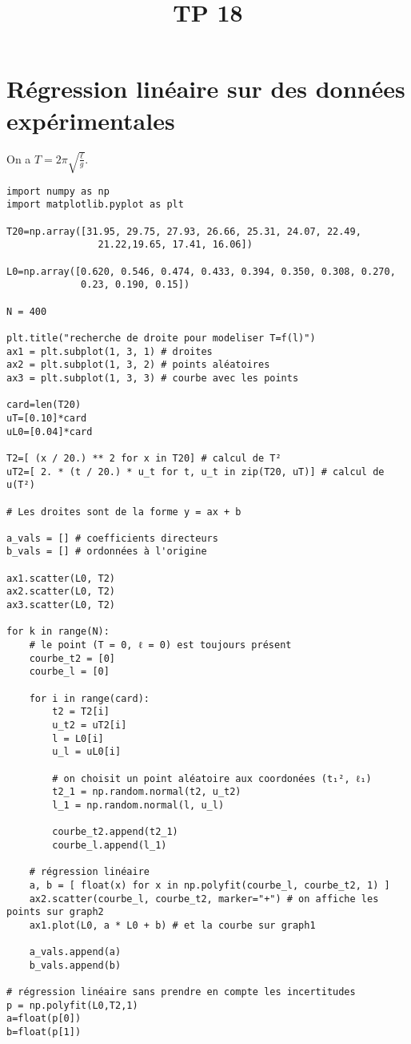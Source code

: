\documentclass[a4paper]{report}
\title{TP 18}{Programmation en Python}{Hugo {\sc Salou}}
\begin{document}
	\section{Régression linéaire sur des données expérimentales}

	On a $T = 2\pi\sqrt{\frac{\ell}{g}}$.

	\begin{verbatim}
import numpy as np
import matplotlib.pyplot as plt

T20=np.array([31.95, 29.75, 27.93, 26.66, 25.31, 24.07, 22.49,
				21.22,19.65, 17.41, 16.06])

L0=np.array([0.620, 0.546, 0.474, 0.433, 0.394, 0.350, 0.308, 0.270,
			 0.23, 0.190, 0.15])

N = 400

plt.title("recherche de droite pour modeliser T=f(l)")
ax1 = plt.subplot(1, 3, 1) # droites
ax2 = plt.subplot(1, 3, 2) # points aléatoires
ax3 = plt.subplot(1, 3, 3) # courbe avec les points

card=len(T20)
uT=[0.10]*card
uL0=[0.04]*card

T2=[ (x / 20.) ** 2 for x in T20] # calcul de T²
uT2=[ 2. * (t / 20.) * u_t for t, u_t in zip(T20, uT)] # calcul de u(T²)

# Les droites sont de la forme y = ax + b

a_vals = [] # coefficients directeurs
b_vals = [] # ordonnées à l'origine

ax1.scatter(L0, T2)
ax2.scatter(L0, T2)
ax3.scatter(L0, T2)

for k in range(N):
	# le point (T = 0, ℓ = 0) est toujours présent
	courbe_t2 = [0]
	courbe_l = [0]

	for i in range(card):
		t2 = T2[i]
		u_t2 = uT2[i]
		l = L0[i]
		u_l = uL0[i]

		# on choisit un point aléatoire aux coordonées (t₁², ℓ₁)
		t2_1 = np.random.normal(t2, u_t2)
		l_1 = np.random.normal(l, u_l)

		courbe_t2.append(t2_1)
		courbe_l.append(l_1)

	# régression linéaire
	a, b = [ float(x) for x in np.polyfit(courbe_l, courbe_t2, 1) ]
	ax2.scatter(courbe_l, courbe_t2, marker="+") # on affiche les points sur graph2
	ax1.plot(L0, a * L0 + b) # et la courbe sur graph1

	a_vals.append(a)
	b_vals.append(b)

# régression linéaire sans prendre en compte les incertitudes
p = np.polyfit(L0,T2,1)
a=float(p[0])
b=float(p[1])


\end{verbatim}
\end{document}
